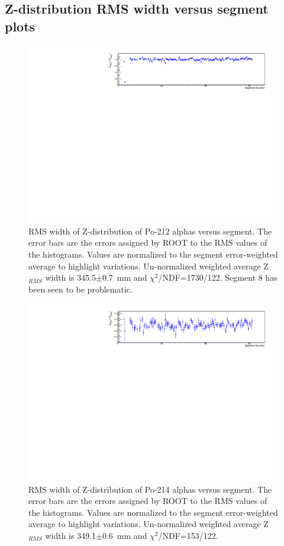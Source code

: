 \newpage
\subsection{Z-distribution RMS width versus segment plots}
\begin{figure}[!h]
\centering
\includegraphics[width=1.05\textwidth]{figures/PubBiPo212ZRMSvsCell.pdf}
\caption{\label{fig:ZRMSvsCell212}RMS width of Z-distribution of Po-212 alphas versus segment. The error bars are the errors assigned by ROOT to the RMS values of the histograms. Values are normalized to the segment error-weighted average to highlight variations. Un-normalized weighted average Z$_{RMS}$ width is 345.5$\pm$0.7~mm and $\chi^2$/NDF=1730/122. Segment 8 has been seen to be problematic.}
\end{figure}
\begin{figure}[!h]
\centering
\includegraphics[width=1.05\textwidth]{figures/PubBiPo214ZRMSvsCell.pdf}
\caption{\label{fig:ZRMSvsCell214}RMS width of Z-distribution of Po-214 alphas versus segment. The error bars are the errors assigned by ROOT to the RMS values of the histograms. Values are normalized to the segment error-weighted average to highlight variations. Un-normalized weighted average Z$_{RMS}$ width is 349.1$\pm$0.6~mm and $\chi^2$/NDF=153/122.}
\end{figure}
\newpage
